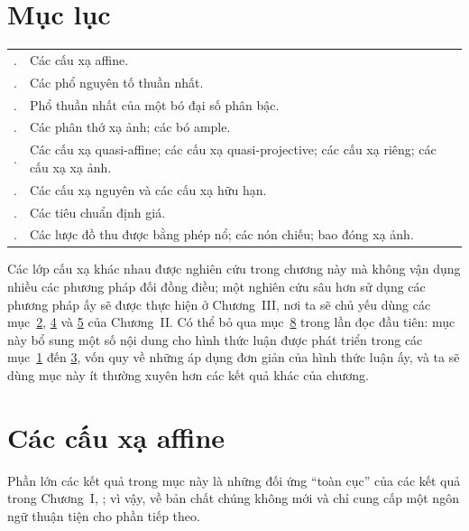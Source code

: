\documentclass[oneside,10pt]{amsart}
\newcommand{\oldpage}[2][]{\marginnote{\normalfont\footnotesize\textbf{#1}~|~#2}\ignorespaces}
\let\EGAOriginalLabel\label
\renewcommand{\label}[1]{\phantomsection\EGAOriginalLabel{#1}}
\begin{document}
\par\endgroup\clearpage

\section*{Mục lục}

\begin{longtable}{@{}p{}p{}@{}}
  \hyperref[section:II.1]{\textsection1}. & Các cấu xạ affine.\\
  \hyperref[section:II.2]{\textsection2}. & Các phổ nguyên tố thuần nhất.\\
  \hyperref[section:II.3]{\textsection3}. & Phổ thuần nhất của một bó đại số phân bậc.\\
  \hyperref[section:II.4]{\textsection4}. & Các phân thớ xạ ảnh; các bó ample.\\
  \hyperref[section:II.5]{\textsection5}. & Các cấu xạ quasi-affine; các cấu xạ quasi-projective; các cấu xạ riêng; các cấu xạ xạ ảnh.\\
  \hyperref[section:II.6]{\textsection6}. & Các cấu xạ nguyên và các cấu xạ hữu hạn.\\
  \hyperref[section:II.7]{\textsection7}. & Các tiêu chuẩn định giá.\\
  \hyperref[section:II.8]{\textsection8}. & Các lược đồ thu được bằng phép nổ; các nón chiếu; bao đóng xạ ảnh.
\end{longtable}
\bigskip

\oldpage[II]{5}
Các lớp cấu xạ khác nhau được nghiên cứu trong chương này mà không vận dụng nhiều các phương pháp đối đồng điều; một nghiên cứu sâu hơn sử dụng các phương pháp ấy sẽ được thực hiện ở Chương~III, nơi ta sẽ chủ yếu dùng các mục~\textsection\textsection\hyperref[section:II.2]{2}, \hyperref[section:II.4]{4} và \hyperref[section:II.5]{5} của Chương~II.
Có thể bỏ qua mục~\textsection\hyperref[section:II.8]{8} trong lần đọc đầu tiên: mục này bổ sung một số nội dung cho hình thức luận được phát triển trong các mục~\textsection\textsection\hyperref[section:II.1]{1} đến \hyperref[section:II.3]{3}, vốn quy về những áp dụng đơn giản của hình thức luận ấy, và ta sẽ dùng mục này ít thường xuyên hơn các kết quả khác của chương.
\bigskip

\section{Các cấu xạ affine}
\label{section:II.1}

Phần lớn các kết quả trong mục này là những đối ứng ``toàn cục'' của các kết quả trong Chương~I, ; vì vậy, về bản chất chúng không mới và chỉ cung cấp một ngôn ngữ thuận tiện cho phần tiếp theo.
\bigskip
\end{document}
